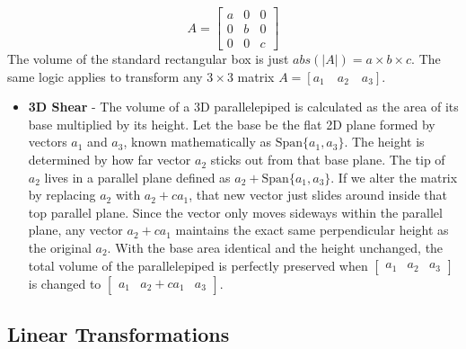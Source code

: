 \documentclass[../linear-algebra.tex]{subfiles}
\begin{document}
\[A = \begin{bmatrix} a & 0 & 0 \\ 0 & b & 0 \\ 0 & 0 & c \end{bmatrix}\]
The volume of the standard rectangular box is just $abs(|A|) = a \times b \times c$.\newline
The same logic applies to transform any $3 \times 3$ matrix $A = [a_1 \quad a_2 \quad a_3]$.
\begin{itemize}
    \item \textbf{3D Shear} - The volume of a 3D parallelepiped is calculated as the area of its base multiplied by its height.
    Let the base be the flat 2D plane formed by vectors $a_1$ and $a_3$, known mathematically as $\text{Span}\{a_1, a_3\}$.
    The height is determined by how far vector $a_2$ sticks out from that base plane. The tip of $a_2$ lives in a parallel plane defined as $a_2 + \text{Span}\{a_1, a_3\}$.
    If we alter the matrix by replacing $a_2$ with $a_2 + ca_1$, that new vector just slides around inside that top parallel plane.
    Since the vector only moves sideways within the parallel plane, any vector $a_2 + ca_1$ maintains the exact same perpendicular height as the original $a_2$.
    With the base area identical and the height unchanged, the total volume of the parallelepiped is perfectly preserved when $\begin{bmatrix} a_1 & a_2 & a_3 \end{bmatrix}$ is changed to $\begin{bmatrix} a_1 & a_2 + ca_1 & a_3 \end{bmatrix}$.
\end{itemize}
\subsection{Linear Transformations}
\end{document}
